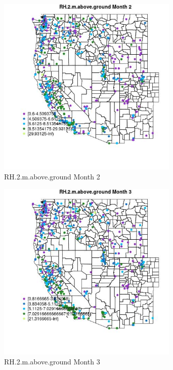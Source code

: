 \begin{figure} 
\centering  
\includegraphics[width=0.77\textwidth]{Code_Outputs/ML_input_report_ML_input_PM25_Step5_part_d_de_duplicated_aves_ML_input_MapObsMo2RH2maboveground.jpg} 
\caption{\label{fig:ML_input_report_ML_input_PM25_Step5_part_d_de_duplicated_aves_ML_inputMapObsMo2RH2maboveground}RH.2.m.above.ground Month 2} 
\end{figure} 
 

\begin{figure} 
\centering  
\includegraphics[width=0.77\textwidth]{Code_Outputs/ML_input_report_ML_input_PM25_Step5_part_d_de_duplicated_aves_ML_input_MapObsMo3RH2maboveground.jpg} 
\caption{\label{fig:ML_input_report_ML_input_PM25_Step5_part_d_de_duplicated_aves_ML_inputMapObsMo3RH2maboveground}RH.2.m.above.ground Month 3} 
\end{figure} 
 

